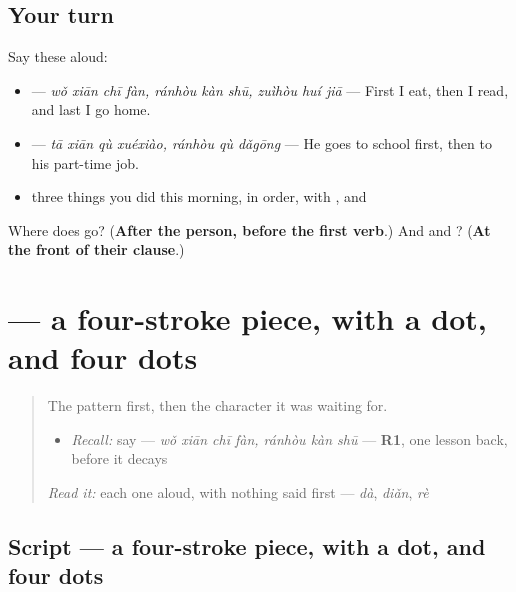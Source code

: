 \subsection*{Your turn}
Say these aloud:

\begin{itemize}
\raggedright
  \item {}   — \emph{wǒ xiān chī fàn, ránhòu kàn shū, zuìhòu huí jiā} — First I eat, then I read, and last I go home.
  \item {}  — \emph{tā xiān qù xuéxiào, ránhòu qù dǎgōng} — He goes to school first, then to his part-time job.
  \item three things you did this morning, in order, with ,  and 
\end{itemize}

\begin{tcolorbox}[breakable,colback=teal!4,colframe=teal!35!black,title={Before you move on}]
Where does  go? (\textbf{After the person, before the first verb}.) And  and ? (\textbf{At the front of their clause}.)
\end{tcolorbox}
\section[\texorpdfstring{\zh{然} (rán)}{然 (rán)}]{ — a four-stroke piece,  with a dot, and four dots}

\label{lesson:ZH-W278-ran}



\begin{quote}
The pattern first, then the character it was waiting for.

\begin{itemize}
\raggedright
  \item \emph{Recall:} say   — \emph{wǒ xiān chī fàn, ránhòu kàn shū} — \textbf{R1}, one lesson back, before it decays
\end{itemize}

\begin{quote}
  
\end{quote}

\emph{Read it:} each one aloud, with nothing said first — \emph{dà}, \emph{diǎn}, \emph{rè}
\end{quote}

\subsection*{Script — a four-stroke piece,  with a dot, and four dots}


